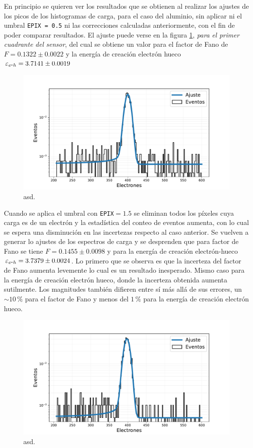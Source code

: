 En principio se quieren ver los resultados que se obtienen al realizar los ajustes de los picos de los histogramas de carga, para el caso del aluminio, sin aplicar ni el umbral \verb|EPIX = 0.5| ni las correcciones calculadas anteriormente, con el fin de poder comparar resultados. El ajuste puede verse en la figura \ref{fig:Al_OHDU1_EPIX05}, \textit{para el primer cuadrante del sensor}, del cual se obtiene un valor para el factor de Fano de $F = 0.1322 \pm 0.0022$ y la energía de creación electrón hueco $\varepsilon_{e\mbox{-}h} = 3.7141 \pm 0.0019$
\begin{figure}[H]
    \centering
        \includegraphics[scale=0.5]{Figs/HistFit_EPIX05_OHDU1_SinCorr.pdf}
    \caption{\footnotesize{asd.}}
    \label{fig:Al_OHDU1_EPIX05}
\end{figure}
Cuando se aplica el umbral con \verb|EPIX|$=1.5$ se eliminan todos los píxeles cuya carga es de un electrón y la estadística del conteo de eventos aumenta, con lo cual se espera una disminución en las incertezas respecto al caso anterior. Se vuelven a generar lo ajustes de los espectros de carga y se desprenden que para factor de Fano se tiene $F = 0.1455 \pm 0.0098$ y para la energía de creación electrón-hueco $\varepsilon_{e\mbox{-}h} = 3.7379 \pm 0.0024$. Lo primero que se observa es que la incerteza del factor de Fano aumenta levemente lo cual es un resultado inesperado. Mismo caso para la energía de creación electrón hueco, donde la incerteza obtenida aumenta sutilmente. Los magnitudes también difieren entre sí más allá de sus errores, un $\sim 10\,\%$ para el factor de Fano y menos del $1\,\%$ para la energía de creación electrón hueco.
\begin{figure}[H]
    \centering
        \includegraphics[scale=0.5]{Figs/HistFit_100c_EPIX15_OHDU1_SinCorr.pdf}
    \caption{\footnotesize{asd.}}
    \label{fig:Al_OHDU1_EPIX15_SinCorr}
\end{figure}
